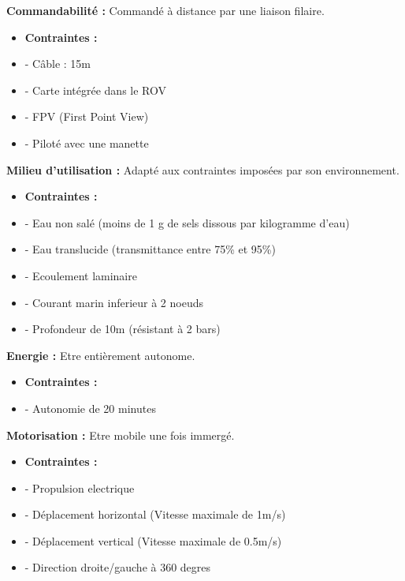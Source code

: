 \documentclass[a4paper,11pt]{report}
\begin{document}
\textbf{\LARGE Commandabilité :\newline \newline}
Commandé à distance par une liaison filaire.\newline
\begin{itemize}
	\item \textbf{Contraintes :}
	\item - Câble : 15m
	\item - Carte intégrée dans le ROV
	\item - FPV (First Point View)
	\item - Piloté avec une manette \newline \newline
\end{itemize}

\textbf{\LARGE Milieu d'utilisation :\newline \newline}
Adapté aux contraintes imposées par son environnement. \newline
\begin{itemize}
	\item \textbf{Contraintes :}
	\item - Eau non salé (moins de 1 g de sels dissous par kilogramme d'eau)
	\item - Eau translucide (transmittance entre 75\% et 95\%)
	\item - Ecoulement laminaire
	\item - Courant marin inferieur à 2 noeuds
	\item - Profondeur de 10m (résistant à 2 bars) \newline \newline
\end{itemize}

\textbf{\LARGE Energie :\newline \newline}
Etre entièrement autonome. \newline
\begin{itemize}
	\item \textbf{Contraintes :}
	\item - Autonomie de 20 minutes \newpage
\end{itemize}

\textbf{\LARGE Motorisation :\newline \newline}
Etre mobile une fois immergé. \newline
\begin{itemize}
	\item \textbf{Contraintes :}
	\item - Propulsion electrique
	\item - Déplacement horizontal (Vitesse maximale de 1m/s)
	\item - Déplacement vertical (Vitesse maximale de 0.5m/s)
	\item - Direction droite/gauche à 360 degres   \newline \newline
\end{itemize}
\end{document}
